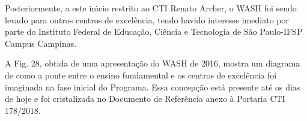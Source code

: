 \documentclass[
12pt,		%
openright,	%
twoside,  %
a4paper,			%
chapter=TITLE,		%
english,			%
french,				%
spanish,			%
brazil				%
]{USPSC-classe/USPSC}
\begin{document}
\noindent\begin{center}\mbox{\centering{}}\end{center}


Posteriormente, a este in\'{\i}cio restrito ao CTI Renato Archer, o WASH foi sendo levado para outros centros de excel\^encia, tendo havido interesse imediato por parte do Instituto Federal de Educa\c{c}\~ao, Ci\^encia e Tecnologia de S\~ao Paulo-IFSP Campus Campinas.

















A Fig. 28, obtida de uma apresenta\c{c}\~ao do WASH de 2016, mostra um diagrama de como a ponte entre o ensino fundamental e os centros de excel\^encia foi imaginada na fase inicial do Programa. Essa concep\c{c}\~ao est\'a presente at\'e os dias de hoje e foi cristalizada no Documento de Refer\^encia anexo \`a Portaria CTI 178/2018.
\end{document}
